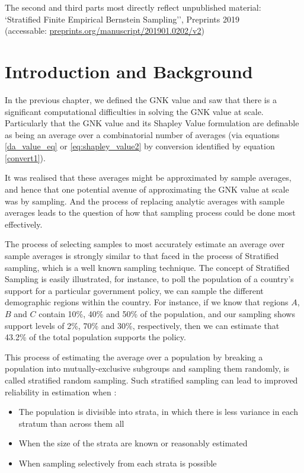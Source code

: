 The second and third parts most directly reflect unpublished material: \\\-\hspace{1cm}`Stratified Finite Empirical Bernstein Sampling'', Preprints 2019\\
(accessable: \href{preprints.org/manuscript/201901.0202/v2}{preprints.org/manuscript/201901.0202/v2})\\

\section{Introduction and Background}

In the previous chapter, we defined the GNK value and saw that there is a significant computational difficulties in solving the GNK value at scale.
Particularly that the GNK value and its Shapley Value formulation are definable as being an average over a combinatorial number of averages (via equations \ref{da_value_eq} or \ref{eq:shapley_value2} by conversion identified by equation \ref{convert1}).

It was realised that these averages might be approximated by sample averages,
and hence that one potential avenue of approximating the GNK value at scale was by sampling.
And the process of replacing analytic averages with sample averages leads to the question of how that sampling process could be done most effectively.

The process of selecting samples to most accurately estimate an average over sample averages is strongly similar to that faced in the process of Stratified sampling, which is a well known sampling technique.
The concept of Stratified Sampling is easily illustrated, for instance, to poll the population of a country's support for a particular government policy, we can sample the different demographic regions within the country.
For instance, if we know that regions $A$,$B$ and $C$ contain 10\%, 40\% and 50\% of the population, and our sampling shows support levels of 2\%, 70\% and 30\%, respectively, then we can estimate that 43.2\% of the total population supports the policy.

This process of estimating the average over a population by breaking a population into mutually-exclusive subgroups and sampling them randomly, is called stratified random sampling.
Such stratified sampling can lead to improved reliability in estimation when \cite{1938.10503378,10.2307/23339498}:
\begin{itemize}
\item The population is divisible into strata, in which there is less variance in each stratum than across them all 
\item When the size of the strata are known or reasonably estimated
\item When sampling selectively from each strata is possible 
\end{itemize}

